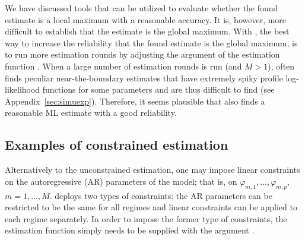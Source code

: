 \documentclass[nojss]{jss} %
\begin{document}
We have discussed tools that can be utilized to evaluate whether the found estimate is a local maximum with a reasonable accuracy. It is, however, more difficult to establish that the estimate is the global maximum. With , the best way to increase the reliability that the found estimate is the global maximum, is to run more estimation rounds by adjusting the argument  of the estimation function . When a large number of estimation rounds is run (and $M>1$),  often finds peculiar near-the-boundary estimates that have extremely spiky profile log-likelihood functions for some parameters and are thus difficult to find (see Appendix~\ref{sec:simuexp}). Therefore, it seems plausible that  also finds a reasonable ML estimate with a good reliability.

\subsection{Examples of constrained estimation}\label{sec:examp_const}
Alternatively to the unconstrained estimation, one may impose linear constraints on the autoregressive (AR) parameters of the model; that is, on $\varphi_{m,1},...,\varphi_{m,p}$, $m=1,...,M$.  deploys two types of constraints: the AR parameters can be restricted to be the same for all regimes and linear constraints can be applied to each regime separately. In order to impose the former type of constraints, the estimation function simply needs to be supplied with the argument .
\end{document}
